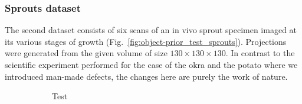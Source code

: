 \documentclass[journal]{IEEEtran}
\begin{document}
\subsubsection{\textbf{Sprouts dataset}}
\label{Sec:sprouts}
The second dataset consists of six scans of an in vivo
sprout specimen imaged at its various stages of growth
(Fig.~\ref{fig:object-prior_test_sprouts}). Projections were generated from the given volume of size $130\times130\times130$. In contrast to the scientific
experiment performed for the case of the okra and the potato where we
introduced man-made defects, the changes here are purely the work of
nature. %
\begin{figure}[!h]
    \begin{subfigure}[b]{0.29\linewidth}
        \caption{Test}
     \end{subfigure}
\quad
    \begin{subfigure}[b]{0.3\linewidth}

\end{subfigure}
\end{figure}
\end{document}
